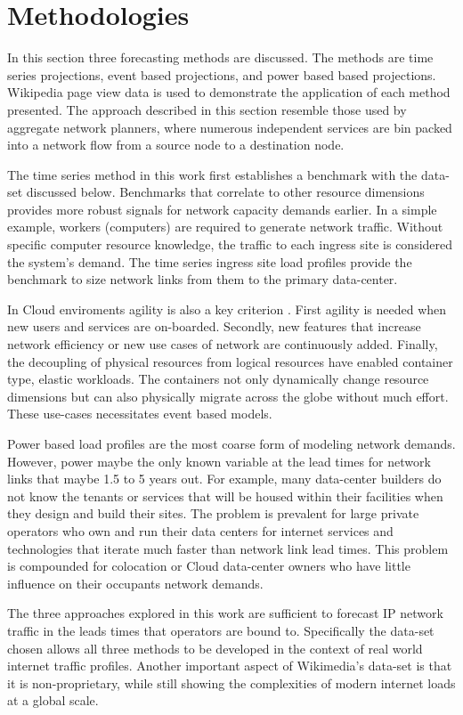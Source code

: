 \documentclass[conference]{IEEEtran}
\begin{document}
\section{Methodologies}

In this section three forecasting methods are discussed. The methods are time series projections, event based projections, and power based based projections. Wikipedia page view data is used to demonstrate the application of each method presented. The approach described in this section resemble those used by aggregate network planners, where numerous independent services are bin packed into a network flow from a source node to a destination node.  

The time series method in this work first establishes a benchmark with the data-set discussed below. Benchmarks that correlate to other resource dimensions provides more robust signals for network capacity demands earlier. In a simple example, workers (computers) are required to generate network traffic. Without specific computer resource knowledge, the traffic to each ingress site is considered the system's demand. The time series ingress site load profiles provide the benchmark to size network links from them to the primary data-center.  

In Cloud enviroments agility is also a key criterion \cite{Spanner}. First agility is needed when new users and services are on-boarded. Secondly, new features that increase network efficiency or new use cases of network are continuously added. Finally, the decoupling of physical resources from logical resources have enabled container type, elastic workloads. The containers not only dynamically change resource dimensions but can also physically migrate across the globe without much effort. These use-cases necessitates event based models. 

Power based load profiles are the most coarse form of modeling network demands. However, power maybe the only known variable at the lead times for network links that maybe 1.5 to 5 years out. For example, many data-center builders do not know the tenants or services that will be housed within their facilities when they design and build their sites. The problem is prevalent for large private operators who own and run their data centers for internet services and technologies that iterate much faster than network link lead times. This problem is compounded for colocation or Cloud data-center owners who have little influence on their occupants network demands.

The three approaches explored in this work are sufficient to forecast IP network traffic in the leads times that operators are bound to. Specifically the data-set chosen allows all three methods to be developed in the context of real world internet traffic profiles. Another important aspect of Wikimedia's data-set is that it is non-proprietary, while still showing the complexities of modern internet loads at a global scale.
\end{document}
